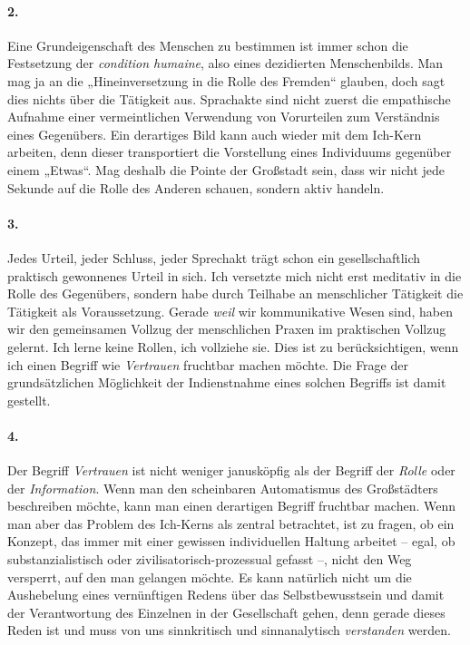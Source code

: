 \documentclass[a4paper,11pt]{article}
\begin{document}
\paragraph{2.} 
Eine Grundeigenschaft des Menschen zu bestimmen ist immer schon die Festsetzung
der \emph{condition humaine}, also eines dezidierten Menschenbilds. Man mag ja
an die „Hineinversetzung in die Rolle des Fremden“ glauben, doch sagt dies
nichts über die Tätigkeit aus. Sprachakte sind nicht zuerst die empathische
Aufnahme einer vermeintlichen Verwendung von Vorurteilen zum Verständnis eines
Gegenübers. Ein derartiges Bild kann auch wieder mit dem Ich-Kern arbeiten,
denn dieser transportiert die Vorstellung eines Individuums gegenüber einem
„Etwas“. Mag deshalb die Pointe der Großstadt sein, dass wir nicht jede Sekunde
auf die Rolle des Anderen schauen, sondern aktiv handeln.

\paragraph{3.} 
Jedes Urteil, jeder Schluss, jeder Sprechakt trägt schon ein gesellschaftlich
praktisch gewonnenes Urteil in sich. Ich versetzte mich nicht erst meditativ in
die Rolle des Gegenübers, sondern habe durch Teilhabe an menschlicher Tätigkeit
die Tätigkeit als Voraussetzung. Gerade \emph{weil} wir kommunikative Wesen
sind, haben wir den gemeinsamen Vollzug der menschlichen Praxen im praktischen
Vollzug gelernt. Ich lerne keine Rollen, ich vollziehe sie. Dies ist zu
berücksichtigen, wenn ich einen Begriff wie \emph{Vertrauen} fruchtbar machen
möchte. Die Frage der grundsätzlichen Möglichkeit der Indienstnahme eines
solchen Begriffs ist damit gestellt.

\paragraph{4.} 
Der Begriff \emph{Vertrauen} ist nicht weniger janusköpfig als der Begriff der
\emph{Rolle} oder der \emph{Information}. Wenn man den scheinbaren Automatismus
des Großstädters beschreiben möchte, kann man einen derartigen Begriff
fruchtbar machen. Wenn man aber das Problem des Ich-Kerns als zentral
betrachtet, ist zu fragen, ob ein Konzept, das immer mit einer gewissen
individuellen Haltung arbeitet – egal, ob substanzialistisch oder
zivilisatorisch-prozessual gefasst –, nicht den Weg versperrt, auf den man
gelangen möchte. Es kann natürlich nicht um die Aushebelung eines vernünftigen
Redens über das Selbstbewusstsein und damit der Verantwortung des Einzelnen in
der Gesellschaft gehen, denn gerade dieses Reden ist und muss von uns
sinnkritisch und sinnanalytisch \emph{verstanden} werden.
\end{document}

